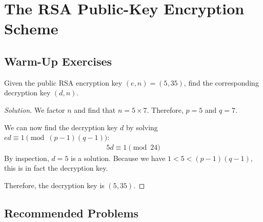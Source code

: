 \chapter{The RSA Public-Key Encryption Scheme}

\section{Warm-Up Exercises}

\begin{warmup}
  Given the public RSA encryption key $(e, n) = (5, 35)$,
  find the corresponding decryption key $(d, n)$.
\end{warmup}
\begin{proof}[Solution]
  We factor $n$ and find that $n = 5 \times 7$.
  Therefore, $p=5$ and $q=7$.

  We can now find the decryption key $d$ by solving $ed \equiv 1 \pmod{(p-1)(q-1)}$:
  \begin{align*}
    5d \equiv 1 \pmod{24}
  \end{align*}
  By inspection, $d=5$ is a solution.
  Because we have $1 < 5 < (p-1)(q-1)$, this is in fact the decryption key.

  Therefore, the decryption key is $(5, 35)$.
\end{proof}


\section{Recommended Problems}

